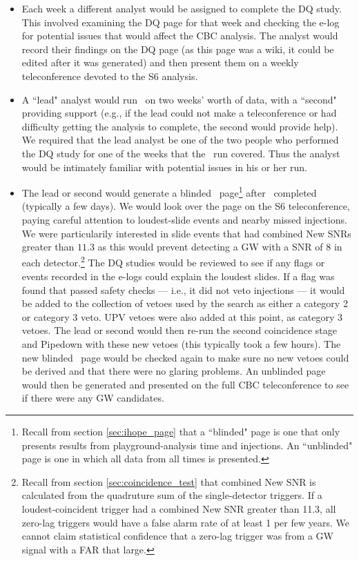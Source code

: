 \begin{itemize}

\item{Each week a different analyst would be assigned to complete the \ac{DQ}
study. This involved examining the DQ page for that week and checking the e-log
for potential issues that would affect the \ac{CBC} analysis. The analyst would
record their findings on the DQ page (as this page was a wiki, it could be
edited after it was generated) and then present them on a weekly teleconference
devoted to the S6 analysis.}

\item{A ``lead" analyst would run \ihope~on two weeks' worth of data, with a
``second" providing support (e.g., if the lead could not make a teleconference
or had difficulty getting the analysis to complete, the second would provide
help). We required that the lead analyst be one of the two people who performed
the DQ study for one of the weeks that the \ihope~run covered. Thus the analyst
would be intimately familiar with potential issues in his or her run.}

\item{The lead or second would generate a blinded \ihope~page\footnote{Recall
from section \ref{sec:ihope_page} that a ``blinded" page is one that only
presents results from playground-analysis time and injections. An ``unblinded"
page is one in which all data from all times is presented.} after
\ihope~completed (typically a few days). We would look over the page on the S6
teleconference, paying careful attention to loudest-slide events and nearby
missed injections. We were particularily interested in slide events that had
combined New \acp{SNR} greater than $11.3$ as this would prevent detecting a
\ac{GW} with a \ac{SNR} of $8$ in each detector.\footnote{Recall from section
\ref{sec:coincidence_test} that combined New SNR is calculated from the
quadruture sum of the single-detector triggers. If a loudest-coincident trigger
had a combined New SNR greater than 11.3, all zero-lag triggers would have a
false alarm rate of at least 1 per few years. We cannot claim statistical
confidence that a zero-lag trigger was from a GW signal with a FAR that large.}
The DQ studies would be reviewed to see if any flags or events recorded in the
e-logs could explain the loudest slides. If a flag was found that passed safety
checks --- i.e., it did not veto injections --- it would be added to the
collection of vetoes used by the search as either a category 2 or category 3
veto. UPV vetoes were also added at this point, as category 3 vetoes. The lead
or second would then re-run the second coincidence stage and Pipedown with
these new vetoes (this typically took a few hours). The new blinded \ihope~page
would be checked again to make sure no new vetoes could be derived and that
there were no glaring problems. An unblinded page would then be generated and
presented on the full \ac{CBC} teleconference to see if there were any \ac{GW}
candidates.}


\end{itemize}
